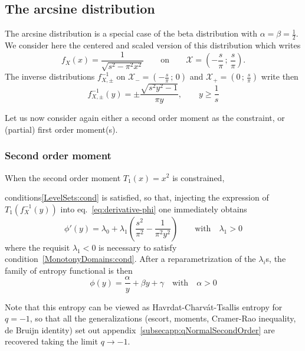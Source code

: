 \documentclass[entropy,article,submit,moreauthors,pdftex]{Definitions/mdpi}
\newcommand{\SZ}[1]{{\color{blue} #1}}                                       %
\def\dmu{\mathrm{d}\mu}%
\def\X{\mathcal{X}}%
\begin{document}

\subsection{The arcsine distribution}
\label{subsecapp:Arcsine}

The arcsine distribution is a special case of the beta distribution with $\alpha
= \beta  = \frac12$. We  consider here the centered  and scaled version  of this
distribution which writes\SZ{
%
\[
f_X(x) = \frac{1}{\sqrt{  s^2 - \pi^2 x^2}} \qquad  \mbox{on} \qquad \X =
\left( - \frac{s}{\pi} \, ; \, \frac{s}{\pi} \right).
\]
%
The inverse distributions $f_{X,\pm}^{-1}$ on $\X_-  = \left( - \frac{s}{\pi} \,
; \, 0 \right)$ and $\X_+ = \left( 0 \, ; \, \frac{s}{\pi} \right)$ write then
%
\[
f_{X,\pm}^{-1}(y) = \pm \frac{\sqrt{s^2  y^2 - 1}}{\pi y}, \qquad y
\ge \frac{1}{s}
\]
}


Let us  now consider again  either a second order  moment as the  constraint, or
(partial) first order moment(s).



\subsubsection{Second order moment}
\label{subsubsecapp:ArcsineSecondOrder}

When   the    second   order   moment    $T_1(x)   =   x^2$    is   constrained,
\SZ{conditions\ref{LevelSets:cond}   is  satisfied,   so  that,   injecting  the
  expression       of      $T_1\left(       f_X^{-1}(y)      \right)$       into
  eq.~\eqref{eq:derivative-phi} one immediately obtains
%
\[
\phi'(y)=\lambda_0  + \lambda_1  \left( \frac{s^2}{\pi^2}  - \frac{1}{\pi^2  y^2}\right)
\qquad \mbox{with} \quad \lambda_1 > 0
\]
%
where    the   requisit    $\lambda_1   <0$    is   necessary    to   satisfy
  condition~\ref{MonotonyDomains:cond}.   After  a   reparametrization  of   the
  $\lambda_i$s, the family of entropy functional is then
%
\[
\phi(y)  = \frac{\alpha}{y} + \beta y + \gamma \quad \mbox{with}
  \quad \alpha > 0
\]
%
%
%

Note that this entropy can be viewed as Havrdat-Charv\'at-Tsallis entropy for $q
= -1$, so that all  the generalizations (escort, moments, Cramer-Rao inequality,
de  Bruijn  identity)  set out  appendix~\ref{subsecapp:qNormalSecondOrder}  are
recovered taking the limit $q \to -1$.}
\end{document}
